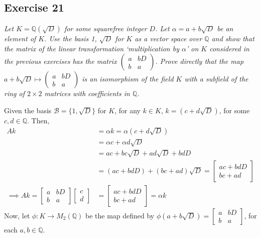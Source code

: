 \subsection*{Exercise 21}
\begin{framed}
\textit{Let $K = \mathbb{Q}(\sqrt{D})$ for some squarefree integer $D$. Let $\alpha = a + b\sqrt{D}$ be an element of $K$. Use the basis 1, $\sqrt{D}$ for $K$ as a vector space over $\mathbb{Q}$ and show that the matrix of the linear transformation `multiplication by $\alpha$' on $K$ considered in the previous exercises has the matrix $\left(\begin{array}{cc}
    a & bD \\
    b & a
\end{array}\right)$. Prove directly that the map $a + b\sqrt{D} \mapsto \left(\begin{array}{cc}
    a & bD \\
    b & a
\end{array}\right)$ is an isomorphism of the field $K$ with a subfield of the ring of $2 \times 2$ matrices with coefficients in $\mathbb{Q}$.}
\end{framed}

Given the basis $\mathcal{B} = \{1, \sqrt{D}\}$ for $K$, for any $k \in K$, $k = (c + d\sqrt{D})$, for some $c, d \in \mathbb{Q}$. Then,
\begin{align*}
    Ak &= \alpha k = \alpha(c + d\sqrt{D}) \\
    &= \alpha c + \alpha d \sqrt{D} \\
    &= ac + bc\sqrt{D} + ad\sqrt{D} + bdD \\
    &= (ac + bdD) + (bc + ad)\sqrt{D} = \left[\begin{array}{c}
    ac + bdD  \\
    bc + ad 
\end{array}\right] \\
\implies Ak = \left[\begin{array}{cc}
    a & bD  \\
    b & a 
\end{array}\right]\left[\begin{array}{c}
    c  \\
    d 
\end{array}\right] &= \left[\begin{array}{c}
    ac + bdD  \\
    bc + ad 
\end{array}\right] = \alpha k
\end{align*}
Now, let $\phi: K \rightarrow M_2(\mathbb{Q})$ be the map defined by $\phi(a + b\sqrt{D}) = \left[\begin{array}{cc}
    a & bD  \\
    b & a 
\end{array}\right]$, for each $a, b \in \mathbb{Q}$. 

